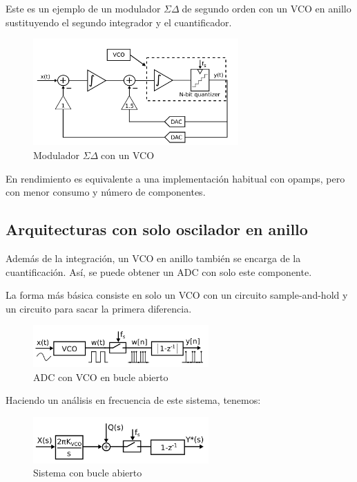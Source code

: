 \documentclass[12pt]{report} %
\newcommand{\sigmadelta}{$\Sigma\Delta\; $}
\begin{document}
	Este es un ejemplo de un modulador \sigmadelta de segundo orden con un VCO en anillo sustituyendo el segundo integrador y el cuantificador.
	\begin{figure}[H]
		\includegraphics[width=0.7\textwidth]{sd-with-vco.png}
		\caption[Modulador \sigmadelta con un VCO]{Modulador \sigmadelta con un VCO\protect\footnotemark}
		\label{fig:sd-with-vco.png}
	\end{figure}
	
	En rendimiento es equivalente a una implementación habitual con opamps, pero con menor consumo y número de componentes. %
	
	\subsection{Arquitecturas con solo oscilador en anillo}
	
	Además de la integración, un VCO en anillo también se encarga de la cuantificación. Así, se puede obtener un ADC con solo este componente.
	
	La forma más básica consiste en solo un VCO con un circuito sample-and-hold y un circuito para sacar la primera diferencia.
	\begin{figure}[H]
		\includegraphics[width=0.6\textwidth]{vco-adc-open-loop.png}
		\caption[ADC con VCO en bucle abierto]{ADC con VCO en bucle abierto\protect\footnotemark}
		\label{fig:vco-adc-open-loop.png}
	\end{figure}
	
	Haciendo un análisis en frecuencia de este sistema, tenemos:
	\begin{figure}[H]
		\includegraphics[width=0.6\textwidth]{vco-adc-open-loop-lp.png}
		\caption[Sistema con bucle abierto]{Sistema con bucle abierto\protect\footnotemark} %
		\label{fig:vco-adc-open-loop-lp.png}
	\end{figure}
	
\end{document}
